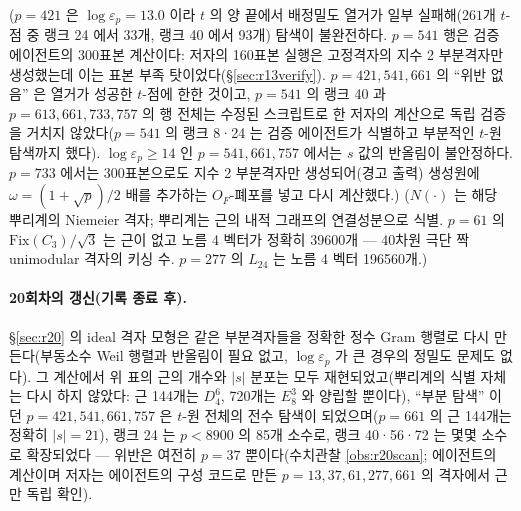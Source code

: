 ($p=421$ 은 $\log\varepsilon_p=13.0$ 이라 $t$ 의 양 끝에서 배정밀도 열거가 일부 실패해($261$개 $t$-점 중 랭크 24 에서 33개, 랭크 40 에서 93개) 탐색이 불완전하다. $p=541$ 행은 검증 에이전트의 300표본 계산이다: 저자의 160표본 실행은 고정격자의 지수 2 부분격자만 생성했는데 이는 표본 부족 탓이었다(\S\ref{sec:r13verify}). $p=421,541,661$ 의 ``위반 없음'' 은 열거가 성공한 $t$-점에 한한 것이고, $p=541$ 의 랭크 40 과 $p=613,661,733,757$ 의 행 전체는 수정된 스크립트로 한 저자의 계산으로 독립 검증을 거치지 않았다($p=541$ 의 랭크 8·24 는 검증 에이전트가 식별하고 부분적인 $t$-원 탐색까지 했다). $\log\varepsilon_p\ge14$ 인 $p=541,661,757$ 에서는 $s$ 값의 반올림이 불안정하다. $p=733$ 에서는 300표본으로도 지수 2 부분격자만 생성되어(경고 출력) 생성원에 $\omega=(1+\sqrt p)/2$ 배를 추가하는 $O_F$-폐포를 넣고 다시 계산했다.) ($N(\cdot)$ 는 해당 뿌리계의 Niemeier 격자; 뿌리계는 근의 내적 그래프의 연결성분으로 식별. $p=61$ 의 $\mathrm{Fix}(C_3)/\sqrt3$ 는 근이 없고 노름 4 벡터가 정확히 39600개 --- 40차원 극단 짝 unimodular 격자의 키싱 수. $p=277$ 의 $L_{24}$ 는 노름 4 벡터 196560개.) \tagN

\paragraph{20회차의 갱신(기록 종료 후).} \S\ref{sec:r20} 의 ideal 격자 모형은 같은 부분격자들을 정확한 정수 Gram 행렬로 다시 만든다(부동소수 Weil 행렬과 반올림이 필요 없고, $\log\varepsilon_p$ 가 큰 경우의 정밀도 문제도 없다). 그 계산에서 위 표의 근의 개수와 $|s|$ 분포는 모두 재현되었고(뿌리계의 식별 자체는 다시 하지 않았다: 근 144개는 $D_4^6$, 720개는 $E_8^3$ 와 양립할 뿐이다), ``부분 탐색'' 이던 $p=421,541,661,757$ 은 $t$-원 전체의 전수 탐색이 되었으며($p=661$ 의 근 144개는 정확히 $|s|=21$), 랭크 24 는 $p<8900$ 의 85개 소수로, 랭크 40·56·72 는 몇몇 소수로 확장되었다 --- 위반은 여전히 $p=37$ 뿐이다(수치관찰 \ref{obs:r20scan}; 에이전트의 계산이며 저자는 에이전트의 구성 코드로 만든 $p=13,37,61,277,661$ 의 격자에서 근만 독립 확인).


